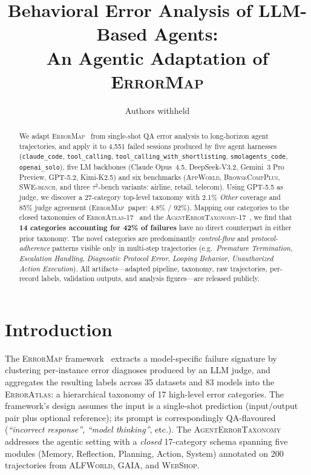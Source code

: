 \documentclass[11pt]{article}
\title{\textbf{Behavioral Error Analysis of LLM-Based Agents:\\
An Agentic Adaptation of \textsc{ErrorMap}}}
\author{Authors withheld}
\date{}
\begin{document}
\maketitle

\begin{abstract}
We adapt \textsc{ErrorMap}~\cite{ashury2026errormap} from
single-shot QA error analysis to long-horizon agent
trajectories, and apply it to 4{,}551 failed sessions produced by
five agent harnesses (\texttt{claude\_code}, \texttt{tool\_calling},
\texttt{tool\_calling\_with\_shortlisting}, \texttt{smolagents\_code},
\texttt{openai\_solo}), five LM backbones (Claude Opus~4.5,
DeepSeek-V3.2, Gemini~3 Pro Preview, GPT-5.2, Kimi-K2.5) and six
benchmarks (\textsc{AppWorld}, \textsc{BrowseCompPlus},
\textsc{SWE-bench}, and three $\tau^2$-bench variants:
airline, retail, telecom). Using GPT-5.5 as judge, we discover a
27-category top-level taxonomy with 2.1\% \emph{Other} coverage and
85\% judge agreement (\textsc{ErrorMap}~paper: 4.8\% / 92\%).
Mapping our categories to the closed taxonomies of
\textsc{ErrorAtlas}-17~\cite{ashury2026errormap} and the
\textsc{AgentErrorTaxonomy}-17~\cite{liu2025agentdebug}, we find
that \textbf{14 categories accounting for 42\% of failures} have no
direct counterpart in either prior taxonomy. The novel categories
are predominantly \emph{control-flow} and \emph{protocol-adherence}
patterns visible only in multi-step trajectories
(e.g.\ \emph{Premature Termination}, \emph{Escalation Handling},
\emph{Diagnostic Protocol Error}, \emph{Looping Behavior},
\emph{Unauthorized Action Execution}). All artifacts---adapted
pipeline, taxonomy, raw trajectories, per-record labels, validation
outputs, and analysis figures---are released publicly.
\end{abstract}

\section{Introduction}

The \textsc{ErrorMap} framework~\cite{ashury2026errormap} extracts
a model-specific failure signature by clustering per-instance error
diagnoses produced by an LLM judge, and aggregates the resulting
labels across 35 datasets and 83 models into the
\textsc{ErrorAtlas}: a hierarchical taxonomy of 17 high-level error
categories. The framework's design assumes the input is a
single-shot prediction (input/output pair plus optional reference);
its prompt is correspondingly QA-flavoured (\emph{``incorrect
response''}, \emph{``model thinking''}, etc.). The
\textsc{AgentErrorTaxonomy}~\cite{liu2025agentdebug} addresses the
agentic setting with a \emph{closed} 17-category schema spanning
five modules (Memory, Reflection, Planning, Action, System) annotated
on 200 trajectories from \textsc{ALFWorld}, \textsc{GAIA}, and
\textsc{WebShop}.
\end{document}
